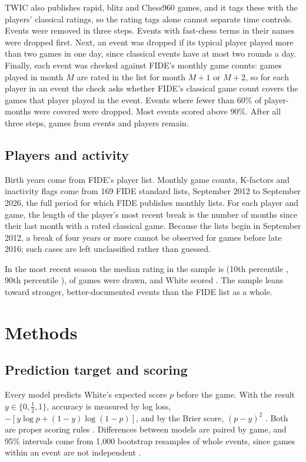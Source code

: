 \documentclass[11pt]{article}
\begin{document}
TWIC also publishes rapid, blitz and Chess960 games, and it tags these with the players' classical ratings, so the rating tags alone cannot separate time controls. Events were removed in three steps. Events with fast-chess terms in their names were dropped first. Next, an event was dropped if its typical player played more than two games in one day, since classical events have at most two rounds a day. Finally, each event was checked against FIDE's monthly game counts: games played in month $M$ are rated in the list for month $M+1$ or $M+2$, so for each player in an event the check asks whether FIDE's classical game count covers the games that player played in the event. Events where fewer than 60\% of player-months were covered were dropped. Most events scored above 90\%. After all three steps, \NGames{} games from \NEvents{} events and \NPlayers{} players remain.

\subsection{Players and activity}

Birth years come from FIDE's player list. Monthly game counts, K-factors and inactivity flags come from 169 FIDE standard lists, September 2012 to September 2026, the full period for which FIDE publishes monthly lists. For each player and game, the length of the player's most recent break is the number of months since their last month with a rated classical game. Because the lists begin in September 2012, a break of four years or more cannot be observed for games before late 2016; such cases are left unclassified rather than guessed.

In the most recent season the median rating in the sample is \MedianRating{} (10th percentile \PTenRating{}, 90th percentile \PNinetyRating{}), \DrawRate{} of games were drawn, and White scored \WhiteScore{}. The sample leans toward stronger, better-documented events than the FIDE list as a whole.

\section{Methods}

\subsection{Prediction target and scoring}

Every model predicts White's expected score $p$ before the game. With the result $y \in \{0, \tfrac12, 1\}$, accuracy is measured by log loss, $-[y\log p + (1-y)\log(1-p)]$, and by the Brier score, $(p-y)^2$ \citep{brier1950}. Both are proper scoring rules \citep{gneiting2007}. Differences between models are paired by game, and 95\% intervals come from 1,000 bootstrap resamples of whole events, since games within an event are not independent \citep{cameron2008}.
\end{document}

